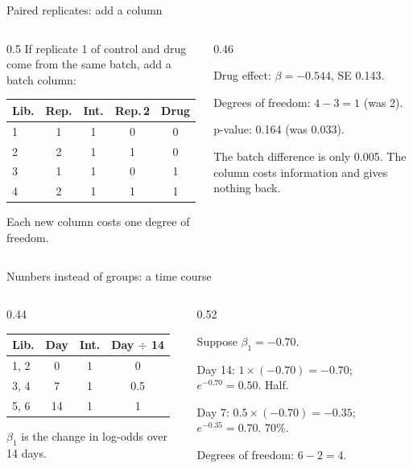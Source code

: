 \documentclass[aspectratio=169,11pt]{beamer}
\begin{document}
\begin{frame}{Paired replicates: add a column}
\begin{columns}[T]
\begin{column}{0.5\textwidth}
\small
If replicate 1 of control and drug come from the same batch, add a batch
column:

\medskip
\begin{tabular}{lc|ccc}
\toprule
Lib. & Rep. & Int. & Rep.\,2 & Drug\\
\midrule
1 & 1 & 1 & 0 & 0\\
2 & 2 & 1 & 1 & 0\\
3 & 1 & 1 & 0 & 1\\
4 & 2 & 1 & 1 & 1\\
\bottomrule
\end{tabular}

\medskip
Each new column costs one degree of freedom.
\end{column}
\begin{column}{0.46\textwidth}
\begin{worked}
\small
Drug effect: $\beta = -0.544$, SE 0.143.

Degrees of freedom: $4 - 3 = 1$ (was 2).

p-value: 0.164 (was 0.033).

The batch difference is only 0.005. The column costs information and gives
nothing back.
\end{worked}
\end{column}
\end{columns}
\end{frame}

\begin{frame}{Numbers instead of groups: a time course}
\begin{columns}[T]
\begin{column}{0.44\textwidth}
\centering
\begin{tabular}{lc|cc}
\toprule
Lib. & Day & Int. & Day $\div$ 14\\
\midrule
1, 2 & 0  & 1 & 0\\
3, 4 & 7  & 1 & 0.5\\
5, 6 & 14 & 1 & 1\\
\bottomrule
\end{tabular}

\medskip
\raggedright\small $\beta_1$ is the change in log-odds over 14 days.
\end{column}
\begin{column}{0.52\textwidth}
\begin{worked}
\small
Suppose $\beta_1 = -0.70$.

Day 14: $1 \times (-0.70) = -0.70$; $e^{-0.70} = 0.50$. Half.

Day 7: $0.5 \times (-0.70) = -0.35$; $e^{-0.35} = 0.70$. 70\%.

Degrees of freedom: $6 - 2 = 4$.
\end{worked}
\end{column}
\end{columns}
\end{frame}
\end{document}
